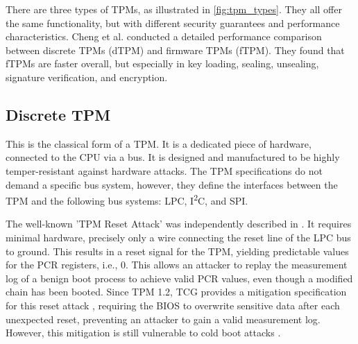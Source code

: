 


There are three types of TPMs, as illustrated in \autoref{fig:tpm_types}. They all offer the same functionality, but with different security guarantees and performance characteristics. Cheng et al. \cite{Cheng2020} conducted a detailed performance comparison between discrete TPMs (dTPM) and firmware TPMs (fTPM). They found that fTPMs are faster overall, but especially in key loading, sealing, unsealing, signature verification, and encryption.

\subsection{Discrete TPM}

This is the classical form of a TPM. It is a dedicated piece of hardware, connected to the CPU via a bus. It is designed and manufactured to be highly temper-resistant against hardware attacks.
The TPM specifications \cite{tpm, tcgPcClient} do not demand a specific bus system, however, they define the interfaces between the TPM and the following bus systems: LPC, I\textsuperscript{2}C, and SPI.

The well-known 'TPM Reset Attack' was independently described in \cite{kauerBernhard,sparks2007}. It requires minimal hardware, precisely only a wire connecting the reset line of the LPC bus \cite{lpc} to ground. This results in a reset signal for the TPM, yielding predictable values for the \ac{PCR} registers, i.e., 0. This allows an attacker to replay the measurement log of a benign boot process to achieve valid \ac{PCR} values, even though a modified chain has been booted.
Since TPM 1.2, TCG provides a mitigation specification for this reset attack \cite{tcgResetFix}, requiring the BIOS to overwrite sensitive data after each unexpected reset, preventing an attacker to gain a valid measurement log.
However, this mitigation is still vulnerable to cold boot attacks \cite{Halderman2009, Winter2013}.

